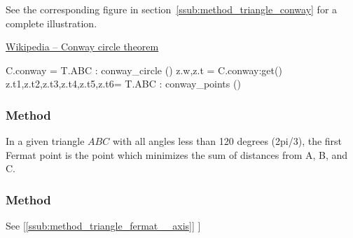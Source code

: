 \medskip
\noindent
See  the corresponding figure in section~\ref{ssub:method_triangle_conway} for a complete illustration.
\begin{flushright}
\small
\href{https://en.wikipedia.org/wiki/Conway_circle_theorem}{Wikipedia – Conway circle theorem}
\end{flushright}

\vspace{1em}

\begin{mybox}
\begin{tkzexample}
  C.conway = T.ABC : conway_circle ()
  z.w,z.t  = C.conway:get() %
  z.t1,z.t2,z.t3,z.t4,z.t5,z.t6= T.ABC : conway_points ()
\end{tkzexample}
\end{mybox}

\subsubsection{Method }
\label{ssub:method_triangle_first_fermat_point}
In a given triangle $ABC$ with all angles less than  120 degrees (2pi/3), the first Fermat point  is the point  which minimizes the sum of distances from A, B, and C.


\begin{tkzexample}[latex=.5\textwidth]
\end{tkzexample}

\subsubsection{Method }
\label{ssub:method_triangle_second__fermat__point}
See  [\ref{ssub:method_triangle_fermat__axis}]
]

